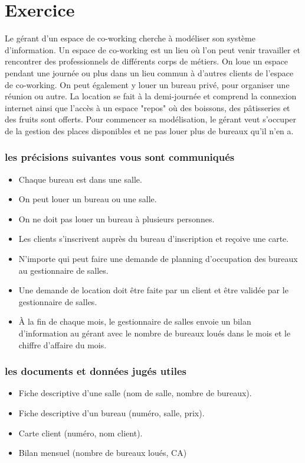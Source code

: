 \section*{Exercice}
Le gérant d'un espace de co-working cherche à modéliser son système d'information. Un espace de co-working est un lieu où l'on peut venir travailler et rencontrer des professionnels de différents corps de métiers. On loue un espace pendant une journée ou plus dans un lieu commun à d'autres clients de l'espace de co-working. On peut également y louer un bureau privé, pour organiser une réunion ou autre. La location se fait à la demi-journée et comprend la connexion internet ainsi que l'accès à un espace "repos" où des boissons, des pâtisseries et des fruits sont offerts.
Pour commencer sa modélisation, le gérant veut s'occuper de la gestion des places disponibles et ne pas louer plus de bureaux qu'il n'en a.


\subsubsection*{les précisions suivantes vous sont communiqués}
\begin{itemize}
    \item Chaque bureau est dans une salle.
    \item On peut louer un bureau ou une salle.
    \item On ne doit pas louer un bureau à plusieurs personnes.
    \item Les clients s'inscrivent auprès du bureau d'inscription et reçoive une carte.
    \item N'importe qui peut faire une demande de planning d'occupation des bureaux au gestionnaire de salles.
    \item Une demande de location doit être faite par un client et être validée par le gestionnaire de salles.
    \item À la fin de chaque mois, le gestionnaire de salles envoie un bilan d'information au gérant avec le nombre de bureaux loués dans le mois et le chiffre d'affaire du mois.
\end{itemize}

\subsubsection*{les documents et données jugés utiles}
\begin{itemize}
    \item Fiche descriptive d'une salle (nom de salle, nombre de bureaux).
    \item Fiche descriptive d'un bureau (numéro, salle, prix).
    \item Carte client (numéro, nom client).
    \item Bilan mensuel (nombre de bureaux loués, CA)
\end{itemize}

